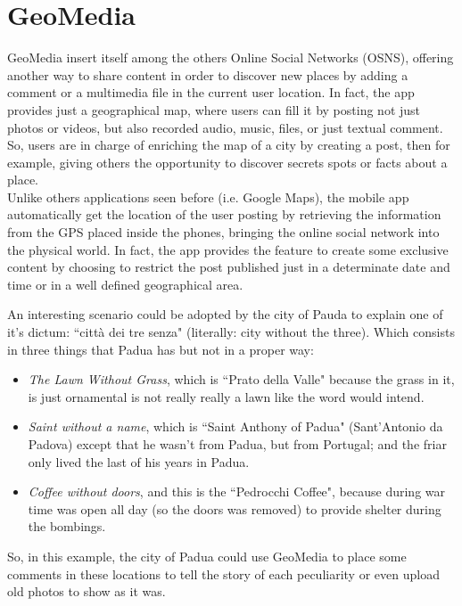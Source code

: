 \documentclass[conference]{IEEEtran}
\begin{document}
\section{GeoMedia}

GeoMedia insert itself among the others Online Social Networks (OSNS), offering another way to share content in order to discover new places by adding a comment or a multimedia file in the current user location.
In fact, the app provides just a geographical map, where users can fill it by posting
not just photos or videos, but also recorded audio, music, files, or just textual comment.
So, users are in charge of enriching the map of a city by creating a post, then for example, giving others the opportunity to discover secrets spots or facts about a place.
\\
Unlike others applications seen before (i.e. Google Maps), the mobile app automatically get the location of the user posting by retrieving the information from the GPS placed inside the phones, bringing the online social network into the physical world. In fact, the app provides the feature to create some exclusive content by choosing to restrict the post published just in a determinate date and time or in a well defined geographical area.

An interesting scenario could be adopted by the city of Pauda to explain one of it's dictum: ``città dei tre senza" (literally: city without the three).
Which consists in three things that Padua has but not in a proper way:
\begin{itemize}
    \item \textit{The Lawn Without Grass}, which is ``Prato della Valle" because the grass in it, is just ornamental is not really really a lawn like the word would intend.
    \item \textit{Saint without a name}, which is ``Saint Anthony of Padua" (Sant'Antonio da Padova) except that he wasn't from Padua, but from Portugal; and the friar only lived the last of his years in Padua.
    \item \textit{Coffee without doors}, and this is the ``Pedrocchi Coffee", because during war time was open all day (so the doors was removed) to provide shelter during the bombings.
\end{itemize}
So, in this example, the city of Padua could use GeoMedia to place some comments in these locations to tell the story of each peculiarity or even upload old photos to show as it was.
\\
\end{document}
